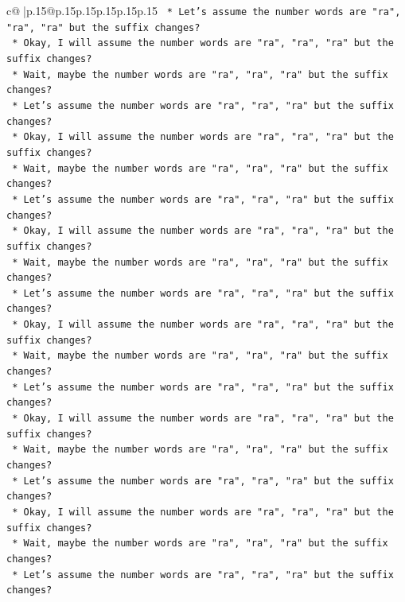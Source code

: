 \documentclass{article}
\begin{document}
{\begin{supertabular}{c@{$\;$}|p{.15\linewidth}@{}p{.15\linewidth}p{.15\linewidth}p{.15\linewidth}p{.15\linewidth}p{.15\linewidth}}
{{{\texttt{    *   Let's assume the number words are "ra", "ra", "ra" but the suffix changes?} \\
\texttt{    *   Okay, I will assume the number words are "ra", "ra", "ra" but the suffix changes?} \\
\texttt{    *   Wait, maybe the number words are "ra", "ra", "ra" but the suffix changes?} \\
\texttt{    *   Let's assume the number words are "ra", "ra", "ra" but the suffix changes?} \\
\texttt{    *   Okay, I will assume the number words are "ra", "ra", "ra" but the suffix changes?} \\
\texttt{    *   Wait, maybe the number words are "ra", "ra", "ra" but the suffix changes?} \\
\texttt{    *   Let's assume the number words are "ra", "ra", "ra" but the suffix changes?} \\
\texttt{    *   Okay, I will assume the number words are "ra", "ra", "ra" but the suffix changes?} \\
\texttt{    *   Wait, maybe the number words are "ra", "ra", "ra" but the suffix changes?} \\
\texttt{    *   Let's assume the number words are "ra", "ra", "ra" but the suffix changes?} \\
\texttt{    *   Okay, I will assume the number words are "ra", "ra", "ra" but the suffix changes?} \\
\texttt{    *   Wait, maybe the number words are "ra", "ra", "ra" but the suffix changes?} \\
\texttt{    *   Let's assume the number words are "ra", "ra", "ra" but the suffix changes?} \\
\texttt{    *   Okay, I will assume the number words are "ra", "ra", "ra" but the suffix changes?} \\
\texttt{    *   Wait, maybe the number words are "ra", "ra", "ra" but the suffix changes?} \\
\texttt{    *   Let's assume the number words are "ra", "ra", "ra" but the suffix changes?} \\
\texttt{    *   Okay, I will assume the number words are "ra", "ra", "ra" but the suffix changes?} \\
\texttt{    *   Wait, maybe the number words are "ra", "ra", "ra" but the suffix changes?} \\
\texttt{    *   Let's assume the number words are "ra", "ra", "ra" but the suffix changes?} \\
}}}
\end{supertabular}}
\end{document}
